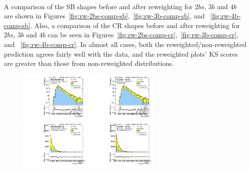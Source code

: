 \paragraph{}
A comparison of the SB shapes before and after reweighting for $2bs$, $3b$ and $4b$ are shown in Figures~\ref{fig:rw-2bs-comp-sb},~\ref{fig:rw-3b-comp-sb}, and ~\ref{fig:rw-4b-comp-sb}. 
Also, a comparison of the CR shapes before and after reweighting for $2bs$, $3b$ and $4b$ can be seen in Figures~\ref{fig:rw-2bs-comp-cr},~\ref{fig:rw-3b-comp-cr}, and ~\ref{fig:rw-4b-comp-cr}. 
In almost all cases, both the reweighted/non-reweighted prediction agrees fairly well with the data, and the reweighted plots' KS scores are greater than those from non-reweighted distributions. 
\begin{figure}[htbp!]
\begin{center}
\includegraphics[width=0.31\textwidth,angle=-90]{figures/boosted/Prereweight/Moriond_TwoTag_split_Sideband_mHH_l_1.pdf}
\includegraphics[width=0.31\textwidth,angle=-90]{figures/boosted/Sideband/b77_TwoTag_split_Sideband_mHH_l_1.pdf}\\
\includegraphics[width=0.31\textwidth,angle=-90]{figures/boosted/Prereweight/Moriond_TwoTag_split_Sideband_leadHCand_Pt_m.pdf}
\includegraphics[width=0.31\textwidth,angle=-90]{figures/boosted/Sideband/b77_TwoTag_split_Sideband_leadHCand_Pt_m.pdf}\\

\end{center}
\end{figure}
